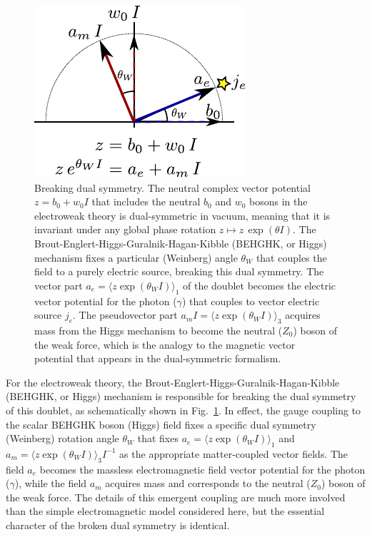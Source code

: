 \documentclass[1p,sort&compress]{elsarticle}
\numberwithin{equation}{section}
\newcommand{\mean}[1]{\langle #1 \rangle}
\begin{document}
\begin{figure}[t]
  \begin{center}
    \includegraphics[width=0.4\columnwidth]{Fig7.pdf}
  \end{center}
  \caption[Breaking dual symmetry]{Breaking dual symmetry. The neutral complex vector potential $z = b_0 + w_0 I$ that includes the neutral $b_0$ and $w_0$ bosons in the electroweak theory is dual-symmetric in vacuum, meaning that it is invariant under any global phase rotation $z \mapsto z\,\exp(\theta I)$.  The Brout-Englert-Higgs-Guralnik-Hagan-Kibble (BEHGHK, or Higgs) mechanism fixes a particular (Weinberg) angle $\theta_W$ that couples the field to a purely electric source, breaking this dual symmetry.  The vector part $a_e = \mean{z\exp(\theta_W I)}_1$ of the doublet becomes the electric vector potential for the photon ($\gamma$) that couples to vector electric source $j_e$.  The pseudovector part $a_m I = \mean{z\exp(\theta_W I)}_3$ acquires mass from the Higgs mechanism to become the neutral ($Z_0$) boson of the weak force, which is the analogy to the magnetic vector potential that appears in the dual-symmetric formalism.}
  \label{fig:symmetrybreaking}
\end{figure}

For the electroweak theory, the Brout-Englert-Higgs-Guralnik-Hagan-Kibble (BEHGHK, or Higgs) mechanism \cite{Englert1964,Higgs1964,Guralnik1964} is responsible for breaking the dual symmetry of this doublet, as schematically shown in Fig.~\ref{fig:symmetrybreaking}.  In effect, the gauge coupling to the scalar BEHGHK boson (Higgs) field fixes a specific dual symmetry (Weinberg) rotation angle $\theta_W$ that fixes $a_e = \mean{z\exp(\theta_W I)}_1$ and $a_m = \mean{z\exp(\theta_W I)}_3I^{-1}$ as the appropriate matter-coupled vector fields.  The field $a_e$ becomes the massless electromagnetic field vector potential for the photon ($\gamma$), while the field $a_m$ acquires mass and corresponds to the neutral ($Z_0$) boson of the weak force.  The details of this emergent coupling are much more involved than the simple electromagnetic model considered here, but the essential character of the broken dual symmetry is identical.
\end{document}

